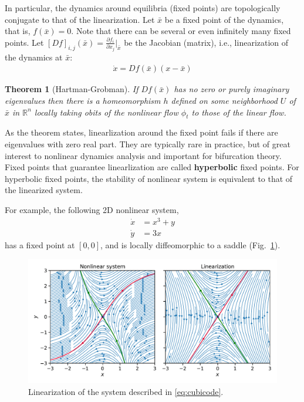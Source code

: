 \documentclass[a4paper,11pt]{exam}
\newtheorem{theorem}{Theorem}
\newcounter{ct}
\newcommand{\field}[1]{\ensuremath{\mathbb{#1}}}
\newcommand{\reals}{\field{R}}
\begin{document}
\begin{questions}
In particular, the dynamics around equilibria (fixed points) are topologically conjugate to that of the linearization.
Let $\bar{x}$ be a fixed point of the dynamics, that is, $f(\bar{x}) = 0$.
Note that there can be several or even infinitely many fixed points.
Let $[Df]_{i,j}(\bar{x}) = \frac{\partial f_i}{\partial x_j}\bigr\rvert_{\bar{x}}$ be the Jacobian (matrix), i.e., linearization of the dynamics at $\bar{x}$:
\begin{align}\label{eq:linearized_around_FP}
    \dot{x} = Df(\bar{x}) (x - \bar{x})
\end{align}

\begin{theorem}[Hartman-Grobman]
    If $Df(\bar{x})$ has no zero or purely imaginary eigenvalues then there is a homeomorphism $h$ defined on some neighborhood $U$ of $\bar{x}$ in $\reals^n$ locally taking obits of the nonlinear flow $\phi_t$ to those of the linear flow.
\end{theorem}
As the theorem states, linearlization around the fixed point fails if there are eigenvalues with zero real part.
They are typically rare in practice, but of great interest to nonlinear dynamics analysis and important for bifurcation theory.
Fixed points that guarantee linearlization are called \textbf{hyperbolic} fixed points.
For hyperbolic fixed points, the stability of nonlinear system is equivalent to that of the linearized system.

For example, the following 2D nonlinear system,
\begin{align}\label{eq:cubicode}
\dot x &= x^3 + y\\
\dot y &= 3x
\end{align}
has a fixed point at $[0, 0]$, and is locally diffeomorphic to a saddle (Fig.~\ref{fig:linearization}).
\begin{figure}[hbt]
    \centering
    \includegraphics[width=\textwidth]{linearization}
    \caption{Linearization of the system described in \eqref{eq:cubicode}.}
    \label{fig:linearization}
\end{figure}


\end{questions}
\end{document}
